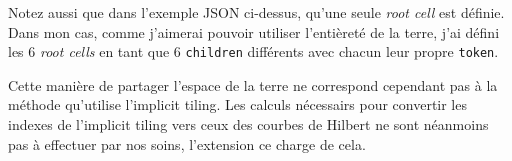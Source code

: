 Notez aussi que dans l'exemple JSON ci-dessus, qu'une seule \textit{root cell} est définie. Dans mon cas, comme j'aimerai pouvoir utiliser l'entièreté de la terre, j'ai défini les 6 \textit{root cells} en tant que 6 \texttt{children} différents avec chacun leur propre \texttt{token}.

Cette manière de partager l'espace de la terre ne correspond cependant pas à la méthode qu'utilise l'implicit tiling. Les calculs nécessairs pour convertir les indexes de l'implicit tiling vers ceux des courbes de Hilbert ne sont néanmoins pas à effectuer par nos soins, l'extension ce charge de cela.